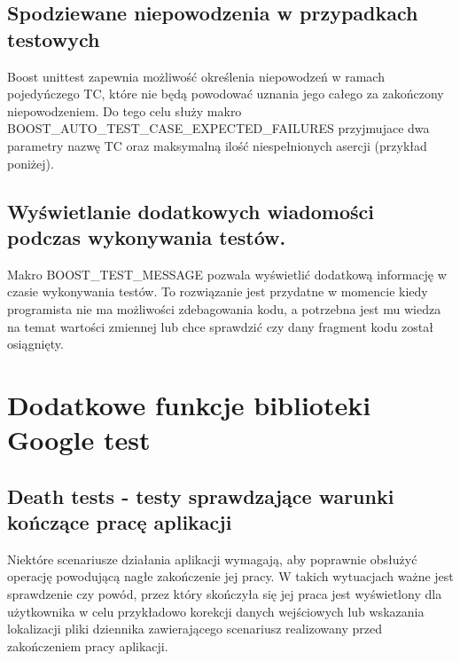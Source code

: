 \documentclass[12pt,a4paper,notitlepage]{report}
\begin{document}
\section{Spodziewane niepowodzenia w przypadkach testowych}

Boost unittest zapewnia możliwość określenia niepowodzeń w ramach pojedyńczego TC, które nie będą powodować uznania jego całego za zakończony niepowodzeniem. Do tego celu służy makro BOOST{\_}AUTO{\_}TEST{\_}CASE{\_}EXPECTED{\_}FAILURES przyjmujace dwa parametry nazwę TC oraz maksymalną ilość niespełnionych asercji (przykład poniżej).

			

\section{Wyświetlanie dodatkowych wiadomości podczas wykonywania testów.}

Makro BOOST{\_}TEST{\_}MESSAGE pozwala wyświetlić dodatkową informację w czasie wykonywania testów. To rozwiązanie jest przydatne w momencie kiedy programista nie ma możliwości zdebagowania kodu, a potrzebna jest mu wiedza na temat wartości zmiennej lub chce sprawdzić czy dany fragment kodu został osiągnięty.

			

\chapter{Dodatkowe funkcje biblioteki Google test}

\section{Death tests - testy sprawdzające warunki kończące pracę aplikacji}

Niektóre scenariusze działania aplikacji wymagają, aby poprawnie obsłużyć operację powodującą nagłe zakończenie jej pracy. W takich wytuacjach ważne jest sprawdzenie czy powód, przez który skończyła się jej praca jest wyświetlony dla użytkownika w celu przykładowo korekcji danych wejściowych lub wskazania lokalizacji pliki dziennika zawierającego scenariusz realizowany przed zakończeniem pracy aplikacji.
\end{document}
